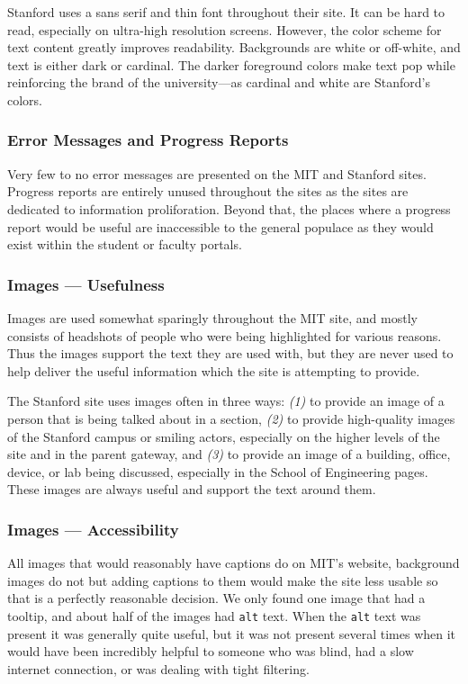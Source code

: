 
Stanford uses a sans serif and thin font throughout their site. It can be hard to read,
especially on ultra-high resolution screens. However, the color scheme for text
content greatly improves readability. Backgrounds are white or off-white, and text
is either dark or cardinal. The darker foreground colors make text pop while
reinforcing the brand of the university---as cardinal and white are Stanford's colors.

\subsubsection*{Error Messages and Progress Reports}

Very few to no error messages are presented on the MIT and Stanford sites.
Progress reports are entirely unused throughout the sites as the sites are dedicated to
information proliforation. Beyond that, the places where a progress report would be
useful are inaccessible to the general populace as they would exist within the student or
faculty portals.

\subsubsection*{Images --- Usefulness}

Images are used somewhat sparingly throughout the MIT site, and mostly consists of headshots of people who were
being highlighted for various reasons. Thus the images support the text they are used
with, but they are never used to help deliver the useful information which the site
is attempting to provide.

The Stanford site uses images often in three ways: \textit{(1)} to provide an image
of a person that is being talked about in a section, \textit{(2)} to provide high-quality
images of the Stanford campus or smiling actors, especially on the higher levels of
the site and in the parent gateway, and \textit{(3)} to provide an image of a building,
office, device, or lab being discussed, especially in the School of Engineering
pages. These images are always useful and support the text around them.

\subsubsection*{Images --- Accessibility}

All images that would reasonably have captions do on MIT's website, background images do not but
adding captions to them would make the site less usable so that is a perfectly reasonable
decision. We only found one image that had a tooltip, and
about half of the images had \texttt{alt} text. When the \texttt{alt} text was present it was generally quite
useful, but it was not present several times when it would have been incredibly helpful to
someone who was blind, had a slow internet connection, or was dealing with tight filtering.

